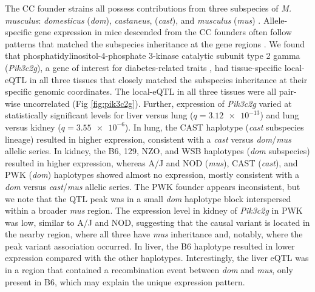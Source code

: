 \documentclass[10pt,letterpaper]{article}
\begin{document}
The CC founder strains all possess contributions from three subspecies of \textit{M. musculus}: \textit{domesticus} (\textit{dom}), \textit{castaneus}, (\textit{cast}), and \textit{musculus} (\textit{mus}) \cite{Yang2011}.  Allele-specific gene expression in mice descended from the CC founders often follow patterns that matched the subspecies inheritance at the gene regions \cite{Crowley2015}.
We found that phosphatidylinositol-4-phosphate 3-kinase catalytic subunit type 2 gamma (\textit{Pik3c2g}), a gene of interest for diabetes-related traits \cite{Braccini2015}, had tissue-specific local-eQTL in all three tissues that closely matched the subspecies inheritance at their specific genomic coordinates. The local-eQTL in all three tissues were all pair-wise uncorrelated (Fig \ref{fig:pik3c2g}). Further, expression of \textit{Pik3c2g} varied at statistically significant levels for liver versus lung ($q = \num{3.12e-13}$) and lung versus kidney ($q = \num{3.55e-6}$). 
In lung, the CAST haplotype (\textit{cast} subspecies lineage) resulted in higher expression, consistent with a \textit{cast} versus \textit{dom}/\textit{mus} allelic series. In kidney, the B6, 129, NZO, and WSB haplotypes  (\textit{dom} subspecies) resulted in higher expression, whereas A/J and NOD (\textit{mus}), CAST (\textit{cast}), and PWK (\textit{dom}) haplotypes showed almost no expression, mostly consistent with a \textit{dom} versus \textit{cast}/\textit{mus} allelic series. The PWK founder appears inconsistent, but we note that the QTL peak was in a small \textit{dom} haplotype block interspersed within a broader \textit{mus} region. The expression level in kidney of \textit{Pik3c2g} in PWK was low, similar to A/J and NOD, suggesting that the causal variant is located in the nearby region, where all three have \textit{mus} inheritance and, notably, where the peak variant association occurred. 
In liver, the B6 haplotype resulted in lower expression compared with the other haplotypes. Interestingly, the liver eQTL was in a region that contained a recombination event between \textit{dom} and \textit{mus}, only present in B6, which may explain the unique expression pattern.
\end{document}
